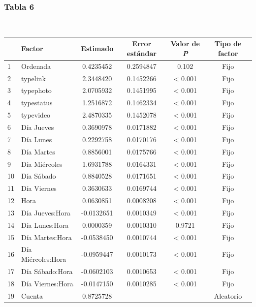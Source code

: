 \documentclass[a4paper,10pt]{article}
\begin{document}
\subsubsection{Tabla 6}
\begin{center}
  \\[0.3cm]
  \begin{tabular}{l|l|c|c|c|c}
     \hline	
    & Factor & Estimado & Error estándar & Valor de \textit{P} & Tipo de factor\\
    \hline
    1 & Ordenada & 0.4235452 & 0.2594847 & 0.102 & Fijo \\
    2 & typelink & 2.3448420 & 0.1452266 & < 0.001 & Fijo \\
    3 & typephoto & 2.0705932 & 0.1451995 & < 0.001 & Fijo \\
    4 & typestatus & 1.2516872 & 0.1462334 & < 0.001 & Fijo \\
    5 & typevideo & 2.4870335 & 0.1452078 & < 0.001 & Fijo \\
    6 & Día Jueves & 0.3690978 & 0.0171882 & < 0.001 & Fijo \\
    7 & Día Lunes & 0.2292758 & 0.0170176 & < 0.001 & Fijo \\
    8 & Día Martes & 0.8856001 & 0.0175766 & < 0.001 & Fijo \\
    9 & Día Miércoles & 1.6931788 & 0.0164331 & < 0.001 & Fijo \\
    10 & Día Sábado & 0.8840528 & 0.0171651 & < 0.001 & Fijo \\
    11 & Día Viernes & 0.3630633 & 0.0169744 & < 0.001 & Fijo \\
    12 & Hora & 0.0630851 & 0.0008208 & < 0.001 & Fijo \\
    13 & Día Jueves:Hora & -0.0132651 & 0.0010349 & < 0.001 & Fijo \\
    14 & Día Lunes:Hora & 0.0000359 & 0.0010310 & 0.9721 & Fijo \\
    15 & Día Martes:Hora & -0.0538450 & 0.0010744 & < 0.001 & Fijo \\
    16 & Día Miércoles:Hora & -0.0959447 & 0.0010173 & < 0.001 & Fijo \\
    17 & Día Sábado:Hora & -0.0602103 & 0.0010653 & < 0.001 & Fijo \\
    18 & Día Viernes:Hora & -0.0147150 & 0.0010285 & < 0.001 & Fijo \\
    19 & Cuenta & 0.8725728 &  &  & Aleatorio \\
    \hline
  \end{tabular}
\end{center}
\end{document}
